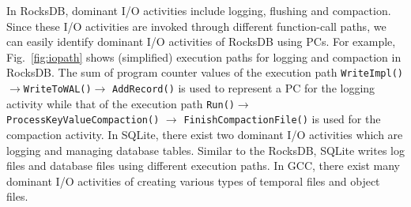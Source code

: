 In RocksDB, dominant I/O activities include logging, flushing and compaction.
Since these I/O activities are invoked through different function-call paths,
we can easily identify dominant I/O activities of RocksDB using PCs.  For
example, Fig.~\ref{fig:iopath} shows (simplified) execution paths for logging
and compaction in RocksDB.  The sum of program counter values of the execution
path \texttt{WriteImpl()}$\rightarrow$\texttt{WriteToWAL()}$\rightarrow$
\texttt{AddRecord()} is used to represent a PC for the logging activity while
that of the execution path \texttt{Run()}$\rightarrow$
\texttt{ProcessKeyValueCompaction()} $\rightarrow$
\texttt{FinishCompactionFile()} is used for the compaction activity.
In SQLite, there exist two dominant I/O activities which are logging and
managing database tables.  Similar to the RocksDB, SQLite writes log files and
database files using different execution paths.  In GCC, there exist many
dominant I/O activities of creating various types of temporal files and object
files.


